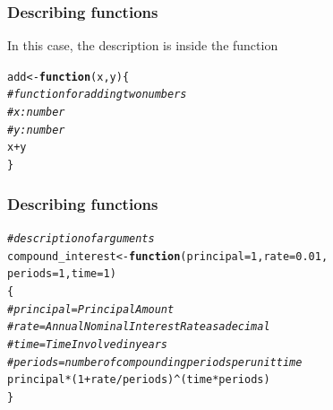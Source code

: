 \documentclass[12pt]{beamer}\usepackage[]{graphicx}\usepackage[]{color}
\makeatletter
\newcommand{\hlnum}[1]{\textcolor[rgb]{0.686,0.059,0.569}{#1}}%
\newcommand{\hlcom}[1]{\textcolor[rgb]{0.678,0.584,0.686}{\textit{#1}}}%
\newcommand{\hlopt}[1]{\textcolor[rgb]{0,0,0}{#1}}%
\newcommand{\hlstd}[1]{\textcolor[rgb]{0.345,0.345,0.345}{#1}}%
\newcommand{\hlkwa}[1]{\textcolor[rgb]{0.161,0.373,0.58}{\textbf{#1}}}%
\newcommand{\hlkwb}[1]{\textcolor[rgb]{0.69,0.353,0.396}{#1}}%
\newcommand{\hlkwc}[1]{\textcolor[rgb]{0.333,0.667,0.333}{#1}}%
\newenvironment{kframe}{%
 \def\at@end@of@kframe{}%
 \ifinner\ifhmode%
  \def\at@end@of@kframe{\end{minipage}}%
  \begin{minipage}{\columnwidth}%
 \fi\fi%
 \def\FrameCommand##1{\hskip\@totalleftmargin \hskip-\fboxsep
 \colorbox{shadecolor}{##1}\hskip-\fboxsep
     \hskip-\linewidth \hskip-\@totalleftmargin \hskip\columnwidth}%
 \MakeFramed {\advance\hsize-\width
   \@totalleftmargin\z@ \linewidth\hsize
   \@setminipage}}%
 {\par\unskip\endMakeFramed%
 \at@end@of@kframe}
\newenvironment{knitrout}{}{} %
\makeatother
\begin{document}

\begin{frame}[fragile]
\frametitle{Describing functions}

In this case, the description is inside the function
\begin{knitrout}\footnotesize
{}\color{fgcolor}\begin{kframe}
\begin{alltt}
\hlstd{add} \hlkwb{<-} \hlkwa{function}\hlstd{(}\hlkwc{x}\hlstd{,} \hlkwc{y}\hlstd{) \{}
  \hlcom{# function for adding two numbers}
  \hlcom{# x: number}
  \hlcom{# y: number}
  \hlstd{x} \hlopt{+} \hlstd{y}
\hlstd{\}}
\end{alltt}
\end{kframe}
\end{knitrout}

\end{frame}


\begin{frame}[fragile]
\frametitle{Describing functions}

\begin{knitrout}\footnotesize
{}\color{fgcolor}\begin{kframe}
\begin{alltt}
\hlcom{# description of arguments}
\hlstd{compound_interest} \hlkwb{<-} \hlkwa{function}\hlstd{(}\hlkwc{principal} \hlstd{=} \hlnum{1}\hlstd{,} \hlkwc{rate} \hlstd{=} \hlnum{0.01}\hlstd{,}
                              \hlkwc{periods} \hlstd{=} \hlnum{1}\hlstd{,} \hlkwc{time} \hlstd{=} \hlnum{1}\hlstd{)}
\hlstd{\{}
  \hlcom{# principal = Principal Amount}
  \hlcom{# rate = Annual Nominal Interest Rate as a decimal}
  \hlcom{# time = Time Involved in years}
  \hlcom{# periods = number of compounding periods per unit time}
  \hlstd{principal} \hlopt{*} \hlstd{(}\hlnum{1} \hlopt{+} \hlstd{rate}\hlopt{/}\hlstd{periods)}\hlopt{^}\hlstd{(time} \hlopt{*} \hlstd{periods)}
\hlstd{\}}
\end{alltt}
\end{kframe}
\end{knitrout}

\end{frame}

\end{document}
